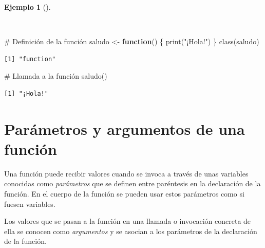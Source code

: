 \documentclass[
  a4paper,
]{scrreport}
\newenvironment{Shaded}{\begin{snugshade}}{\end{snugshade}}
\newcommand{\CommentTok}[1]{\textcolor[rgb]{0.37,0.37,0.37}{#1}}
\newcommand{\ControlFlowTok}[1]{\textcolor[rgb]{0.00,0.23,0.31}{\textbf{#1}}}
\newcommand{\FunctionTok}[1]{\textcolor[rgb]{0.28,0.35,0.67}{#1}}
\newcommand{\NormalTok}[1]{\textcolor[rgb]{0.00,0.23,0.31}{#1}}
\newcommand{\OtherTok}[1]{\textcolor[rgb]{0.00,0.23,0.31}{#1}}
\newcommand{\StringTok}[1]{\textcolor[rgb]{0.13,0.47,0.30}{#1}}
\theoremstyle{definition}
\theoremstyle{definition}
\newtheorem{example}{Ejemplo}[chapter]
\theoremstyle{remark}
\begin{document}
\begin{example}[]\protect\hypertarget{exm-creacion-funcion}{}\label{exm-creacion-funcion}

~

\begin{Shaded}
\begin{Highlighting}[]
\CommentTok{\# Definición de la función}
\NormalTok{saludo }\OtherTok{\textless{}{-}} \ControlFlowTok{function}\NormalTok{() \{}
  \FunctionTok{print}\NormalTok{(}\StringTok{"¡Hola!"}\NormalTok{)}
\NormalTok{\}}
\FunctionTok{class}\NormalTok{(saludo)}
\end{Highlighting}
\end{Shaded}

\begin{verbatim}
[1] "function"
\end{verbatim}

\begin{Shaded}
\begin{Highlighting}[]
\CommentTok{\# Llamada a la función}
\FunctionTok{saludo}\NormalTok{()}
\end{Highlighting}
\end{Shaded}

\begin{verbatim}
[1] "¡Hola!"
\end{verbatim}

\end{example}

\section{Parámetros y argumentos de una
función}\label{paruxe1metros-y-argumentos-de-una-funciuxf3n}

Una función puede recibir valores cuando se invoca a través de unas
variables conocidas como \emph{parámetros} que se definen entre
paréntesis en la declaración de la función. En el cuerpo de la función
se pueden usar estos parámetros como si fuesen variables.

Los valores que se pasan a la función en una llamada o invocación
concreta de ella se conocen como \emph{argumentos} y se asocian a los
parámetros de la declaración de la función.
\end{document}

